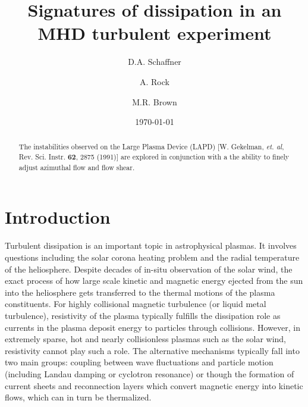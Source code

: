 \documentclass[aip,pop,amsmath,amssymb,reprint,superscriptaddress]{revtex4-1} %
\begin{document}
\title{Signatures of dissipation in an MHD turbulent experiment}
\author{D.A. Schaffner}
\author{A. Rock}
\author{M.R. Brown}
\date{\today}
\begin{abstract}
The instabilities observed on the Large Plasma Device (LAPD) [W. Gekelman, \textit{et. al}, Rev. Sci. Instr. \textbf{62}, 2875 (1991)] are explored in conjunction with a the ability to finely adjust azimuthal flow and flow shear.

\end{abstract}
\maketitle

\section{Introduction}

Turbulent dissipation is an important topic in astrophysical plasmas. It involves questions including the solar corona heating problem and the radial temperature of the heliosphere. Despite decades of in-situ observation of the solar wind, the exact process of how large scale kinetic and magnetic energy ejected from the sun into the heliosphere gets transferred to the thermal motions of the plasma constituents. For highly collisional magnetic turbulence (or liquid metal turbulence), resistivity of the plasma typically fulfills the dissipation role as currents in the plasma deposit energy to particles through collisions. However, in extremely sparse, hot and nearly collisionless plasmas such as the solar wind, resistivity cannot play such a role. The alternative mechanisms typically fall into two main groups: coupling between wave fluctuations and particle motion (including Landau damping or cyclotron resonance) or though the formation of current sheets and reconnection layers which convert magnetic energy into kinetic flows, which can in turn be thermalized.
\end{document}
